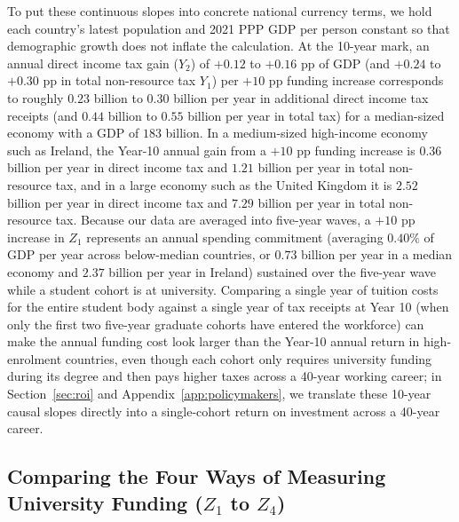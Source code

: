 \documentclass[11pt,a4paper]{article}
\begin{document}
To put these continuous slopes into concrete national currency terms, we hold each country's latest population and 2021 PPP GDP per person constant so that demographic growth does not inflate the calculation. At the 10-year mark, an annual direct income tax gain ($Y_2$) of $+0.12$ to $+0.16$ pp of GDP (and $+0.24$ to $+0.30$ pp in total non-resource tax $Y_1$) per $+10$ pp funding increase corresponds to roughly \texteuro$0.23$ billion to \texteuro$0.30$ billion per year in additional direct income tax receipts (and \texteuro$0.44$ billion to \texteuro$0.55$ billion per year in total tax) for a median-sized economy with a GDP of \texteuro$183$ billion. In a medium-sized high-income economy such as Ireland, the Year-10 annual gain from a $+10$ pp funding increase is \texteuro$0.36$ billion per year in direct income tax and \texteuro$1.21$ billion per year in total non-resource tax, and in a large economy such as the United Kingdom it is \texteuro$2.52$ billion per year in direct income tax and \texteuro$7.29$ billion per year in total non-resource tax. Because our data are averaged into five-year waves, a $+10$ pp increase in $Z_1$ represents an annual spending commitment (averaging $0.40\%$ of GDP per year across below-median countries, or \texteuro$0.73$ billion per year in a median economy and \texteuro$2.37$ billion per year in Ireland) sustained over the five-year wave while a student cohort is at university. Comparing a single year of tuition costs for the entire student body against a single year of tax receipts at Year 10 (when only the first two five-year graduate cohorts have entered the workforce) can make the annual funding cost look larger than the Year-10 annual return in high-enrolment countries, even though each cohort only requires university funding during its degree and then pays higher taxes across a 40-year working career; in Section~\ref{sec:roi} and Appendix~\ref{app:policymakers}, we translate these 10-year causal slopes directly into a single-cohort return on investment across a 40-year career.

\subsection{Comparing the Four Ways of Measuring University Funding (\texorpdfstring{$Z_1$ to $Z_4$}{Z1 to Z4})}
\label{sec:unbundling}
\end{document}
